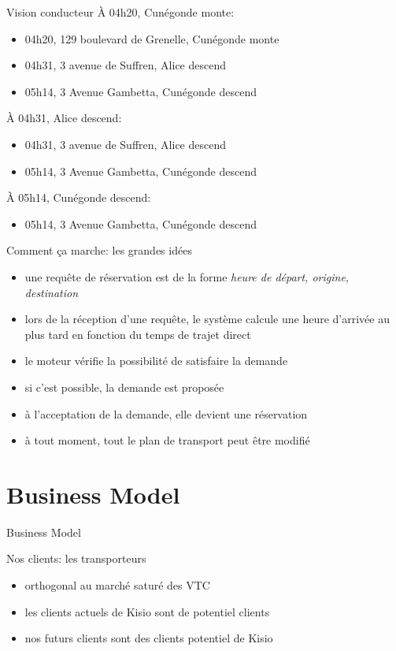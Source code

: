 \documentclass[table]{beamer}
\begin{document}
\begin{frame}[allowframebreaks]{Vision conducteur}
  À 04h20, Cunégonde monte:
  \begin{itemize}
  \item<42> 04h20, 129 boulevard de Grenelle, Cunégonde monte
  \item 04h31, 3 avenue de Suffren, Alice descend
  \item 05h14, 3 Avenue Gambetta, Cunégonde descend
  \end{itemize}\framebreak

  À 04h31, Alice descend:
  \begin{itemize}
  \item<42> 04h31, 3 avenue de Suffren, Alice descend
  \item 05h14, 3 Avenue Gambetta, Cunégonde descend
  \end{itemize}\framebreak

  À 05h14, Cunégonde descend:
  \begin{itemize}
  \item<42> 05h14, 3 Avenue Gambetta, Cunégonde descend
  \end{itemize}
\end{frame}

\begin{frame}{Comment ça marche: les grandes idées}
  \begin{itemize}
  \item une requête de réservation est de la forme \emph{heure de
      départ, origine, destination}
  \item lors de la réception d'une requête, le système calcule une heure
    d'arrivée au plus tard en fonction du temps de trajet direct
  \item le moteur vérifie la possibilité de satisfaire la demande
  \item si c'est possible, la demande est proposée
  \item à l'acceptation de la demande, elle devient une réservation
  \item à tout moment, tout le plan de transport peut être modifié
  \end{itemize}
\end{frame}

\section{Business Model}

\begin{frame}{Business Model}

  Nos clients: les transporteurs
  \begin{itemize}
  \item orthogonal au marché saturé des VTC
  \item les clients actuels de Kisio sont de potentiel clients
  \item nos futurs clients sont des clients potentiel de Kisio
  \end{itemize}
\end{frame}
\end{document}
